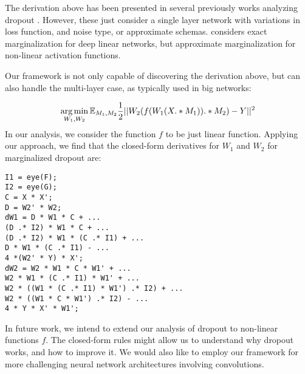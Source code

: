
The derivation above has been presented in several previously works
analyzing dropout \cite{chen2013learning, chen2012marginalized, maaten2013learning}. 
However, these just consider a single layer network with variations in loss function, and noise type, 
or approximate schemas. \cite{baldi2014dropout} considers exact marginalization 
for deep linear networks, but approximate marginalization for non-linear activation functions.

Our framework is not only capable of discovering the derivation above,
but can also handle the multi-layer case, as typically used in big networks:



 


\begin{equation*}
  \operatorname*{arg\,min}_{W_1, W_2} \mathbb{E}_{M_1, M_2} \frac{1}{2}||W_2(f(W_1(X .* M_1)) .* M_2) - Y||^2
\end{equation*}
In our analysis, we consider the function $f$ to be just linear 
function.  Applying our approach, we find that the closed-form derivatives for $W_1$ and $W_2$ for marginalized 
dropout are:
\begin{lstlisting}
I1 = eye(F);
I2 = eye(G);
C = X * X';
D = W2' * W2;
dW1 = D * W1 * C + ...
(D .* I2) * W1 * C + ...
(D .* I2) * W1 * (C .* I1) + ...
D * W1 * (C .* I1) - ...
4 *(W2' * Y) * X'; 
dW2 = W2 * W1 * C * W1' + ...
W2 * W1 * (C .* I1) * W1' + ...
W2 * ((W1 * (C .* I1) * W1') .* I2) + ...
W2 * ((W1 * C * W1') .* I2) - ...
4 * Y * X' * W1';
\end{lstlisting}

In future work, we intend to extend our analysis of dropout to
non-linear functions $f$. The closed-form rules might
allow us to understand why dropout works, and how to improve it. We
would also like to  employ our framework for more challenging neural network architectures involving
convolutions.
